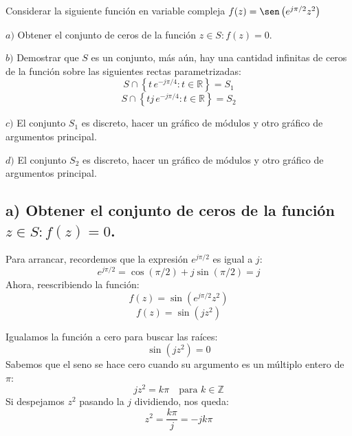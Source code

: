 \documentclass[a4paper, 12pt]{article}
\begin{document}
Considerar la siguiente función en variable compleja $f(z) = \sen \left(e^{j\pi/2}z^2\right)$

\vspace{0.4cm}

$a)$ Obtener el conjunto de ceros de la función $z \in S : f(z) = 0$.

\vspace{0.4cm}

$b)$ Demostrar que $S$ es un conjunto, más aún, hay una cantidad infinitas de ceros de la función sobre las siguientes rectas parametrizadas:
\[
S \cap \left\{t\, e^{-j\pi/4} : t \in \mathbb{R}\right\} = S_1
\]
\vspace{0.2cm}
\[
S \cap \left\{t j\, e^{-j\pi/4} : t \in \mathbb{R}\right\} = S_2
\]

\vspace{0.4cm}

$c)$ El conjunto $S_1$ es discreto, hacer un gráfico de módulos y otro gráfico de argumentos
principal.

\vspace{0.4cm}

$d)$ El conjunto $S_2$ es discreto, hacer un gráfico de módulos y otro gráfico de argumentos
principal.


\subsection{a) Obtener el conjunto de ceros de la función $z \in S : f(z) = 0$. }
Para arrancar, recordemos que la expresión $e^{j\pi/2}$  es igual a $j$:
\[ e^{j\pi/2} = \cos(\pi/2) + j\sin(\pi/2) = j \]
Ahora, reescribiendo la función:
\[ f(z) = \sin(e^{j\pi/2} z^2) \]
\[ f(z) = \sin(j z^2) \]



Igualamos la función a cero para buscar las raíces:
\[ \sin(j z^2) = 0 \]
Sabemos que el seno se hace cero cuando su argumento es un múltiplo entero de $\pi$:
\[ j z^2 = k\pi \quad \text{para } k \in \mathbb{Z} \]
Si despejamos $z^2$ pasando la $j$ dividiendo, nos queda:
\[ z^2 = \frac{k\pi}{j} = -j k\pi \]
\newpage
\end{document}

